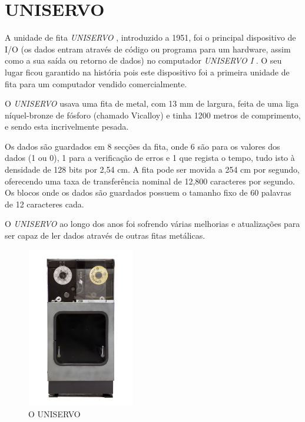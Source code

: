 \documentclass{report}
\begin{document}
\newpage

	\section{UNISERVO}

	A unidade de fita \textit{UNISERVO}  , introduzido a 1951, foi o principal dispositivo de I/O (os dados entram através de código ou programa para um hardware, assim como a sua saída ou retorno de dados) no computador \textit{UNISERVO I} . O seu lugar ficou garantido na história pois este dispositivo foi a primeira unidade de fita para um computador vendido comercialmente. 
\vspace{1mm}	
	
	O \textit{UNISERVO}  usava uma fita de metal, com 13 mm de largura, feita de uma liga níquel-bronze de fósforo (chamado Vicalloy) e tinha 1200 metros de comprimento, e sendo esta incrivelmente pesada.
\vspace{1mm}
	
	Os dados são guardados em 8 secções da fita, onde 6 são para os valores dos dados (1 ou 0), 1 para a verificação de erros e 1 que regista o tempo, tudo isto à densidade de 128 bits por 2,54 cm. A fita pode ser movida a 254 cm por segundo, oferecendo uma taxa de transferência nominal de 12,800 caracteres por segundo. Os blocos onde os dados são guardados possuem o tamanho fixo de 60 palavras de 12 caracteres cada.
\vspace{1mm}
	
	O \textit{UNISERVO}  ao longo dos anos foi sofrendo várias melhorias e atualizações para ser capaz de ler dados através de outras fitas metálicas.

\begin{figure}[h]
		\centering
		\includegraphics[width=4.7cm, height=7cm]{uniservo.jpg}
		\caption{O UNISERVO}
		\end{figure}
	
\end{document}
